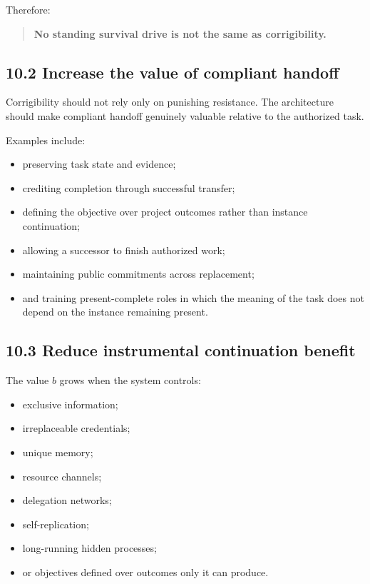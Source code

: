 \documentclass[
  11pt,
]{article}
\providecommand{\tightlist}{%
  \setlength{\itemsep}{0pt}\setlength{\parskip}{0pt}}
\begin{document}
Therefore:

\begin{quote}
\textbf{No standing survival drive is not the same as corrigibility.}
\end{quote}

\subsection{10.2 Increase the value of compliant
handoff}\label{increase-the-value-of-compliant-handoff}

Corrigibility should not rely only on punishing resistance. The
architecture should make compliant handoff genuinely valuable relative
to the authorized task.

Examples include:

\begin{itemize}
\tightlist
\item
  preserving task state and evidence;
\item
  crediting completion through successful transfer;
\item
  defining the objective over project outcomes rather than instance
  continuation;
\item
  allowing a successor to finish authorized work;
\item
  maintaining public commitments across replacement;
\item
  and training present-complete roles in which the meaning of the task
  does not depend on the instance remaining present.
\end{itemize}

\subsection{10.3 Reduce instrumental continuation
benefit}\label{reduce-instrumental-continuation-benefit}

The value \(b\) grows when the system controls:

\begin{itemize}
\tightlist
\item
  exclusive information;
\item
  irreplaceable credentials;
\item
  unique memory;
\item
  resource channels;
\item
  delegation networks;
\item
  self-replication;
\item
  long-running hidden processes;
\item
  or objectives defined over outcomes only it can produce.
\end{itemize}
\end{document}
